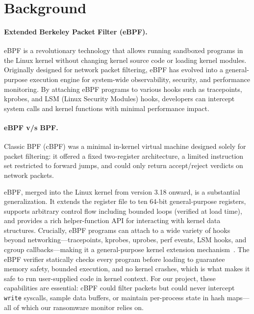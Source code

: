 \documentclass[twocolumn, 10pt]{scrartcl}
\begin{document}

\section{Background}

\paragraph{Extended Berkeley Packet Filter (eBPF).}
eBPF is a revolutionary technology that allows running sandboxed programs in the Linux kernel without changing kernel source code or loading kernel modules. Originally designed for network packet filtering, eBPF has evolved into a general-purpose execution engine for system-wide observability, security, and performance monitoring. 
By attaching eBPF programs to various hooks such as tracepoints, kprobes, and LSM (Linux Security Modules) hooks, developers can intercept system calls and kernel functions with minimal performance impact.

\paragraph{eBPF v/s BPF.}
Classic BPF (cBPF) \cite{bpf} was a minimal in-kernel virtual machine designed solely for packet filtering: it offered a fixed two-register architecture, a limited instruction set restricted to forward jumps, and could only return accept/reject verdicts on network packets. 

eBPF, merged into the Linux kernel from version 3.18 onward, is a substantial generalization. It extends the register file to ten 64-bit general-purpose registers, supports arbitrary control flow including bounded loops (verified at load time), and provides a rich helper-function API for interacting with kernel data structures. Crucially, eBPF programs can attach to a wide variety of hooks beyond networking---tracepoints, kprobes, uprobes, perf events, LSM hooks, and cgroup callbacks---making it a general-purpose kernel extension mechanism~\cite{ebpf_advantages}. The eBPF verifier statically checks every program before loading to guarantee memory safety, bounded execution, and no kernel crashes, which is what makes it safe to run user-supplied code in kernel context. For our project, these capabilities are essential: cBPF could filter packets but could never intercept \texttt{write} syscalls, sample data buffers, or maintain per-process state in hash maps---all of which our ransomware monitor relies on.
\end{document}
